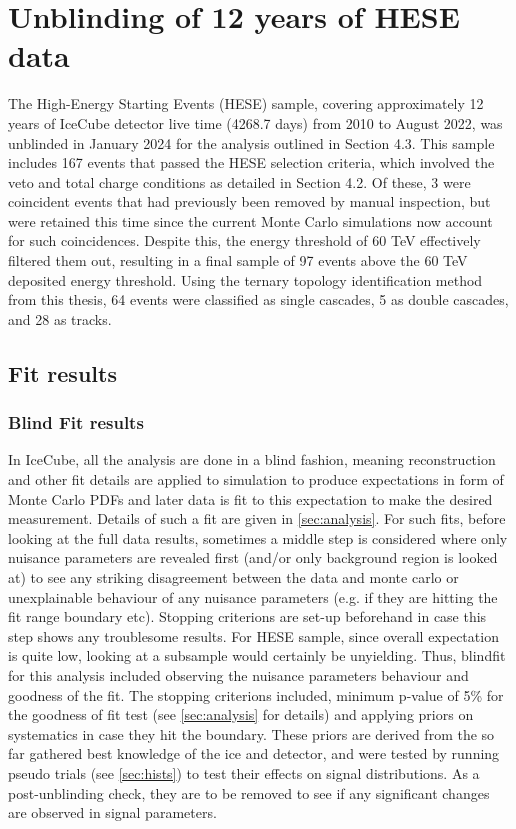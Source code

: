 \section{Unblinding of 12 years of HESE data}
\label{sec:HESE12}
The High-Energy Starting Events (HESE) sample, covering approximately 12 years of IceCube detector live time (4268.7 days) from 2010 to August 2022, was unblinded in January 2024 for the analysis outlined in Section 4.3. This sample includes 167 events that passed the HESE selection criteria, which involved the veto and total charge conditions as detailed in Section 4.2. Of these, 3 were coincident events that had previously been removed by manual inspection, but were retained this time since the current Monte Carlo simulations now account for such coincidences. Despite this, the energy threshold of 60 TeV effectively filtered them out, resulting in a final sample of 97 events above the 60 TeV deposited energy threshold. Using the ternary topology identification method from this thesis, 64 events were classified as single cascades, 5 as double cascades, and 28 as tracks.



\subsection{Fit results}
\label{sec:HESE12_fitresults}

\subsubsection{Blind Fit results}
\label{blindfit}
In IceCube, all the analysis are done in a blind fashion, meaning reconstruction and other fit details are applied to simulation to produce expectations in form of Monte Carlo PDFs and later data is fit to this expectation to make the desired measurement. Details of such a fit are given in \ref{sec:analysis}. For such fits, before looking at the full data results, sometimes a middle step is considered where only nuisance parameters are revealed first (and/or only background region is looked at) to see any striking disagreement between the data and monte carlo or unexplainable behaviour of any nuisance parameters (e.g. if they are hitting the fit range boundary etc).  Stopping criterions are set-up beforehand in case this step shows any troublesome results. For HESE sample, since overall expectation is quite low, looking at a subsample would certainly be unyielding. Thus, blindfit for this analysis included observing the nuisance parameters behaviour and goodness of the fit. The stopping criterions included, minimum p-value of 5\% for the goodness of fit test (see \ref{sec:analysis} for details) and applying priors on systematics in case they hit the boundary. These priors are derived from the so far gathered best knowledge of the ice and detector, and were tested by running pseudo trials (see \ref{sec:hists}) to test their effects on signal distributions. As a post-unblinding check, they are to be removed to see if any significant changes are observed in signal parameters. 

